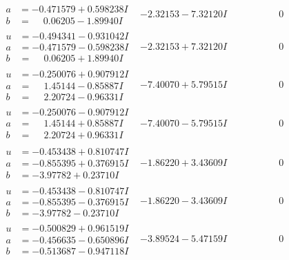 \documentclass[1p]{elsarticle_modified}
\theoremstyle{definition}
\begin{document}
$$\begin{array}{c|c|c}
\begin{aligned}
a &= -0.471579 + 0.598238 I \\
b &= \phantom{-}0.06205 - 1.89940 I\end{aligned}
 & -2.32153 - 7.32120 I & \phantom{-0.000000 } 0 \\ \hline\begin{aligned}
u &= -0.494341 - 0.931042 I \\
a &= -0.471579 - 0.598238 I \\
b &= \phantom{-}0.06205 + 1.89940 I\end{aligned}
 & -2.32153 + 7.32120 I & \phantom{-0.000000 } 0 \\ \hline\begin{aligned}
u &= -0.250076 + 0.907912 I \\
a &= \phantom{-}1.45144 - 0.85887 I \\
b &= \phantom{-}2.20724 - 0.96331 I\end{aligned}
 & -7.40070 + 5.79515 I & \phantom{-0.000000 } 0 \\ \hline\begin{aligned}
u &= -0.250076 - 0.907912 I \\
a &= \phantom{-}1.45144 + 0.85887 I \\
b &= \phantom{-}2.20724 + 0.96331 I\end{aligned}
 & -7.40070 - 5.79515 I & \phantom{-0.000000 } 0 \\ \hline\begin{aligned}
u &= -0.453438 + 0.810747 I \\
a &= -0.855395 + 0.376915 I \\
b &= -3.97782 + 0.23710 I\end{aligned}
 & -1.86220 + 3.43609 I & \phantom{-0.000000 } 0 \\ \hline\begin{aligned}
u &= -0.453438 - 0.810747 I \\
a &= -0.855395 - 0.376915 I \\
b &= -3.97782 - 0.23710 I\end{aligned}
 & -1.86220 - 3.43609 I & \phantom{-0.000000 } 0 \\ \hline\begin{aligned}
u &= -0.500829 + 0.961519 I \\
a &= -0.456635 - 0.650896 I \\
b &= -0.513687 - 0.947118 I\end{aligned}
 & -3.89524 - 5.47159 I & \phantom{-0.000000 } 0 \\ \hline\begin{aligned}

\end{aligned}
\end{array}$$
\end{document}
